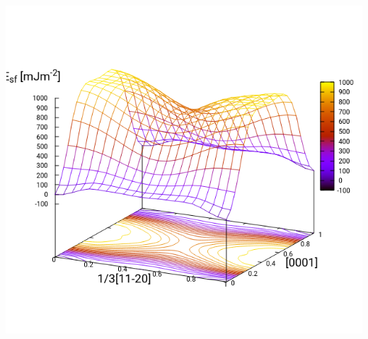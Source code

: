 \documentclass[11pt]{article}
\begin{document}
\begin{center}
\includegraphics[width=.9\linewidth]{Images/prismatic_gs_noo_2019-11-08_alat.png}
\end{center}
\end{document}
